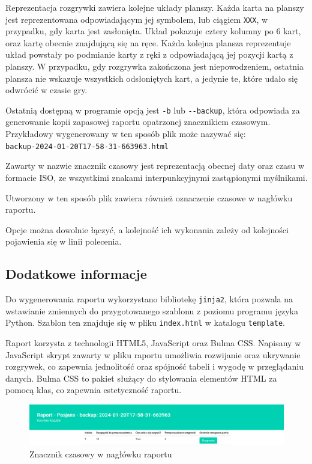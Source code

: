 \documentclass[12pt,a4paper]{article}
\begin{document}
Reprezentacja rozgrywki zawiera kolejne układy planszy. Każda karta na planszy jest reprezentowana odpowiadającym jej symbolem, lub ciągiem \texttt{XXX}, w przypadku, gdy karta jest zasłonięta. Układ pokazuje cztery kolumny po 6 kart, oraz kartę obecnie znajdującą się na ręce. Każda kolejna plansza reprezentuje układ powstały po podmianie karty z ręki z odpowiadającą jej pozycji kartą z planszy. W przypadku, gdy rozgrywka zakończona jest niepowodzeniem, ostatnia plansza nie wskazuje wszystkich odsłoniętych kart, a jedynie te, które udało się odwrócić w czasie gry.

Ostatnią dostępną w programie opcją jest \texttt{-b} lub \texttt{-{}-backup}, która odpowiada za generowanie kopii zapasowej raportu opatrzonej znacznikiem czasowym. Przykładowy wygenerowany w ten sposób plik może nazywać się:\\ \texttt{backup-2024-01-20T17-58-31-663963.html}

Zawarty w nazwie znacznik czasowy jest reprezentacją obecnej daty oraz czasu w formacie ISO, ze wszystkimi znakami interpunkcyjnymi zastąpionymi myślnikami.

Utworzony w ten sposób plik zawiera również oznaczenie czasowe w nagłówku raportu.

Opcje można dowolnie łączyć, a kolejność ich wykonania zależy od kolejności pojawienia się w linii polecenia.

\subsection*{Dodatkowe informacje}
Do wygenerowania raportu wykorzystano bibliotekę \texttt{jinja2}, która pozwala na wstawianie zmiennych do przygotowanego szablonu z poziomu programu języka Python. Szablon ten znajduje się w pliku \texttt{index.html} w katalogu \texttt{template}.

Raport korzysta z technologii HTML5, JavaScript oraz Bulma CSS. Napisany w JavaScript skrypt zawarty w pliku raportu umożliwia rozwijanie oraz ukrywanie rozgrywek, co zapewnia jednolitość oraz spójność tabeli i wygodę w przeglądaniu danych. Bulma CSS to pakiet służący do stylowania elementów HTML za pomocą klas, co zapewnia estetyczność raportu.

\begin{figure}
    \centering
    \includegraphics[width=0.75\linewidth]{raport-backup.png}
    \caption{Znacznik czasowy w nagłówku raportu}
    \label{fig:backup-report}
\end{figure}
\end{document}
